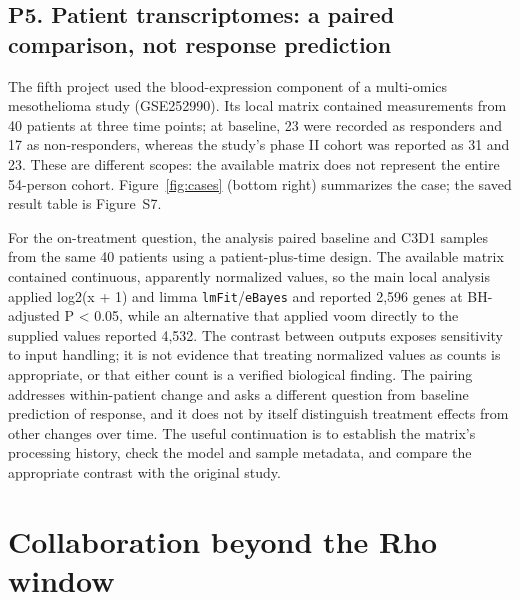 \documentclass[11pt]{article}
\begin{document}
\FloatBarrier

\subsection{P5. Patient transcriptomes: a paired comparison, not response prediction}\label{p5}

The fifth project used the blood-expression component of a multi-omics mesothelioma study \cite{chin2025} (GSE252990). Its local matrix contained measurements from 40 patients at three time points; at baseline, 23 were recorded as responders and 17 as non-responders, whereas the study's phase II cohort was reported as 31 and 23. These are different scopes: the available matrix does not represent the entire 54-person cohort. Figure~\ref{fig:cases} (bottom right) summarizes the case; the saved result table is Figure~S7.

For the on-treatment question, the analysis paired baseline and C3D1 samples from the same 40 patients using a patient-plus-time design. The available matrix contained continuous, apparently normalized values, so the main local analysis applied log2(x + 1) and limma \texttt{lmFit}/\texttt{eBayes} and reported 2,596 genes at BH-adjusted P \textless{} 0.05, while an alternative that applied voom directly to the supplied values reported 4,532. The contrast between outputs exposes sensitivity to input handling; it is not evidence that treating normalized values as counts is appropriate, or that either count is a verified biological finding. The pairing addresses within-patient change and asks a different question from baseline prediction of response, and it does not by itself distinguish treatment effects from other changes over time. The useful continuation is to establish the matrix's processing history, check the model and sample metadata, and compare the appropriate contrast with the original study.

\FloatBarrier

\section{Collaboration beyond the Rho window}\label{beyond}
\end{document}
